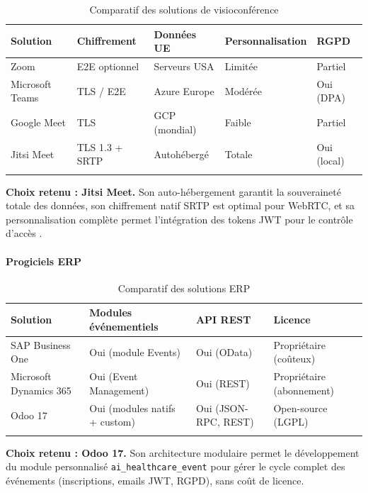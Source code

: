 \begin{longtable}{|m{3.5cm}|m{2.5cm}|m{2.5cm}|m{2.5cm}|m{1.5cm}|}
\hline
\textbf{Solution} & \textbf{Chiffrement} & \textbf{Données UE} & \textbf{Personnalisation} & \textbf{RGPD} \\
\hline
\endhead
\endfoot
\endlastfoot
\hline
Zoom & E2E optionnel & Serveurs USA & Limitée & Partiel \\
\hline
Microsoft Teams & TLS / E2E & Azure Europe & Modérée & Oui (DPA) \\
\hline
Google Meet & TLS & GCP (mondial) & Faible & Partiel \\
\hline
Jitsi Meet & TLS 1.3 + SRTP & Autohébergé & Totale & Oui (local) \\
\hline
\captionsetup{justification=centering,margin=2cm}
\caption{Comparatif des solutions de visioconférence}
\label{tab:visio}
\end{longtable}

\textbf{Choix retenu : Jitsi Meet.} Son auto-hébergement garantit la souveraineté totale des données, son chiffrement natif SRTP est optimal pour WebRTC, et sa personnalisation complète permet l'intégration des tokens JWT pour le contrôle d'accès \cite{webrtc}.

\paragraph{Progiciels ERP}

\begin{longtable}{|m{4cm}|m{3.5cm}|m{2.5cm}|m{2.5cm}|}
\hline
\textbf{Solution} & \textbf{Modules événementiels} & \textbf{API REST} & \textbf{Licence} \\
\hline
\endhead
\endfoot
\endlastfoot
\hline
SAP Business One & Oui (module Events) & Oui (OData) & Propriétaire (coûteux) \\
\hline
Microsoft Dynamics 365 & Oui (Event Management) & Oui (REST) & Propriétaire (abonnement) \\
\hline
Odoo 17 & Oui (modules natifs + custom) & Oui (JSON-RPC, REST) & Open-source (LGPL) \\
\hline
\captionsetup{justification=centering,margin=2cm}
\caption{Comparatif des solutions ERP}
\label{tab:erp}
\end{longtable}

\textbf{Choix retenu : Odoo 17.} Son architecture modulaire permet le développement du module personnalisé \texttt{ai\_healthcare\_event} pour gérer le cycle complet des événements (inscriptions, emails JWT, RGPD), sans coût de licence.


